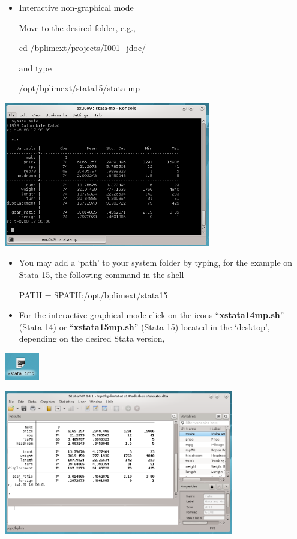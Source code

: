 \documentclass[]{book}
\begin{document}
\begin{itemize}
\item
  Interactive non-graphical mode

  Move to the desired folder, e.g.,

  cd /bplimext/projects/I001\_jdoe/

  and type

  /opt/bplimext/stata15/stata-mp
\end{itemize}

\includegraphics[width=3.54331in,height=2.4886in]{./media/image10.png}

\begin{itemize}
\item
  You may add a `path' to your system folder by typing, for the
  example on Stata 15, the following command in the shell

  PATH = \$PATH:/opt/bplimext/stata15
\item
  For the interactive graphical mode click on the icons
  ``\textbf{{xstata14mp.sh}}'' (Stata 14) or
  ``\textbf{{xstata15mp.sh}}'' (Stata 15) located in the
  `desktop', depending on the desired Stata version,
\end{itemize}

\includegraphics[width=0.59055in,height=0.46654in]{./media/image11.png}

\includegraphics[width=3.93701in,height=2.48638in]{./media/image12.png}
\end{document}
